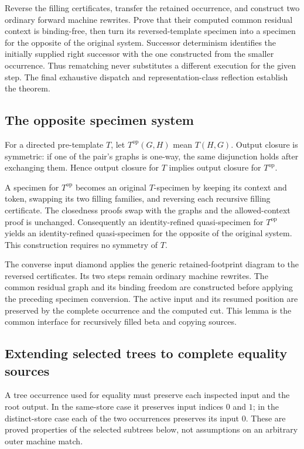 Reverse the filling certificates, transfer the retained occurrence, and
construct two ordinary forward machine rewrites. Prove that their computed
common residual context is binding-free, then turn its reversed-template
specimen into a specimen for the opposite of the original system. Successor
determinism identifies the initially supplied right successor with the one
constructed from the smaller occurrence. Thus rematching never substitutes
a different execution for the given step. The final exhaustive dispatch and
representation-class reflection establish the theorem.

\subsection{The opposite specimen system}
For a directed pre-template $T$, let $T^{\mathrm{op}}(G,H)$ mean $T(H,G)$.
Output closure is symmetric: if one of the pair's graphs is one-way, the
same disjunction holds after exchanging them. Hence output closure for $T$
implies output closure for $T^{\mathrm{op}}$.

A specimen for $T^{\mathrm{op}}$ becomes an original $T$-specimen by keeping
its context and token, swapping its two filling families, and reversing
each recursive filling certificate. The closedness proofs swap with the
graphs and the allowed-context proof is unchanged. Consequently an
identity-refined quasi-specimen for $T^{\mathrm{op}}$ yields an
identity-refined quasi-specimen for the opposite of the original system.
This construction requires no symmetry of $T$.

The converse input diamond applies the generic retained-footprint diagram
to the reversed certificates. Its two steps remain ordinary machine
rewrites. The common residual graph and its binding freedom are constructed
before applying the preceding specimen conversion. The active input and
its resumed position are preserved by the complete occurrence and the
computed cut. This lemma is the common interface for recursively filled
beta and copying sources.
\par{}

\subsection{Extending selected trees to complete equality sources}
A tree occurrence used for equality must preserve each inspected input and
the root output. In the same-store case it preserves input indices $0$ and
$1$; in the distinct-store case each of the two occurrences preserves its
input $0$. These are proved properties of the selected subtrees below,
not assumptions on an arbitrary outer machine match.

